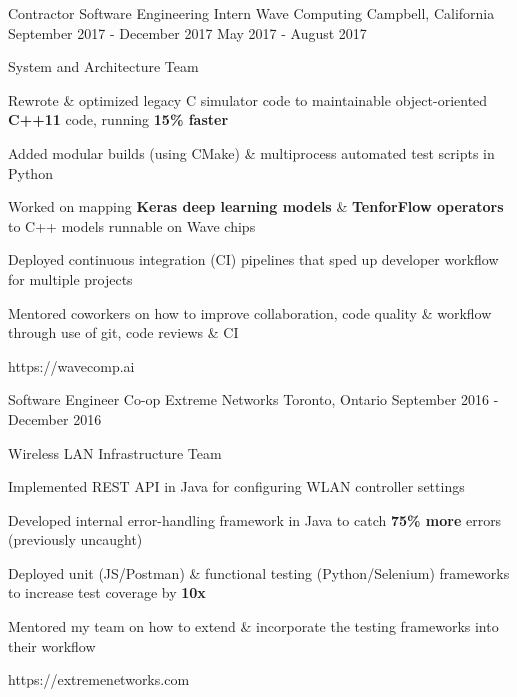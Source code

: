 


\begin{cventries}


\cventrylink
{Contractor \newline {\vspace{-.75mm}}
Software Engineering Intern}
{Wave Computing}
{Campbell, California}
{September 2017 - December 2017 \newline {\vspace{-1mm}}
May 2017 - August 2017}
{ %
System and Architecture Team
\begin{cvitems}
\item[]
\item {Rewrote \& optimized legacy C simulator code to maintainable object-oriented \textbf{C++11} code, running \textbf{15\% faster}}
\item {Added modular builds (using CMake) \& multiprocess automated test scripts in Python}
\item {Worked on mapping \textbf{Keras deep learning models} \& \textbf{TenforFlow operators} to C++ models runnable on Wave chips}
\item {Deployed continuous integration (CI) pipelines that sped up developer workflow for multiple projects }
\item {Mentored coworkers on how to improve collaboration, code quality \& workflow through use of git, code reviews \& CI}
\end{cvitems}
}
{https://wavecomp.ai}


\cventrylink
{Software Engineer Co-op}
{Extreme Networks}
{Toronto, Ontario}
{September 2016 - December 2016}
{ %
Wireless LAN Infrastructure Team
\begin{cvitems}
\item[]
\item {Implemented REST API in Java for configuring WLAN controller settings}
\item {Developed internal error-handling framework in Java to catch \textbf{75\% more} errors (previously uncaught)}
\item {Deployed unit (JS/Postman) \& functional testing (Python/Selenium) frameworks to increase test coverage by \textbf{10x}}
\item {Mentored my team on how to extend \& incorporate the testing frameworks into their workflow}
\end{cvitems}
}
{https://extremenetworks.com}


\end{cventries}
